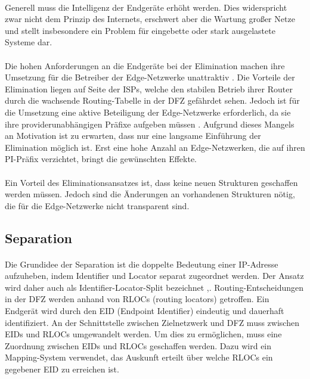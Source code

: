 \paragraph{}
Generell muss die Intelligenz der Endgeräte erhöht werden. Dies widerspricht zwar nicht dem Prinzip des Internets, erschwert aber die Wartung großer Netze und stellt insbesondere ein Problem für eingebette oder stark ausgelastete Systeme dar. 

\paragraph{}
Die hohen Anforderungen an die Endgeräte bei der Elimination machen ihre Umsetzung für die Betreiber der Edge-Netzwerke unattraktiv \cite{jen:2008:start}. Die Vorteile der Elimination liegen auf Seite der ISPs, welche den stabilen Betrieb ihrer Router durch die wachsende Routing-Tabelle in der DFZ gefährdet sehen. Jedoch ist für die Umsetzung eine aktive Beteiligung der Edge-Netzwerke erforderlich, da sie ihre providerunabhängigen Präfixe aufgeben müssen \cite{jen:2008:start}. Aufgrund dieses Mangels an Motivation ist zu erwarten, dass nur eine langsame Einführung der Elimination möglich ist. Erst eine hohe Anzahl an Edge-Netzwerken, die auf ihren PI-Präfix verzichtet, bringt die gewünschten Effekte. 

\paragraph{}
Ein Vorteil des Eliminationsansatzes ist, dass keine neuen Strukturen geschaffen werden müssen. Jedoch sind die Änderungen an vorhandenen Strukturen nötig, die für die Edge-Netzwerke nicht transparent sind.

\subsection{Separation}
\paragraph{}
Die Grundidee der Separation ist die doppelte Bedeutung einer IP-Adresse aufzuheben, indem Identifier und Locator separat zugeordnet werden. Der Ansatz wird daher auch als Identifier-Locator-Split bezeichnet \cite{deering:1996:map},\cite{jen:2008:start}. Routing-Entscheidungen in der DFZ werden anhand von RLOCs (routing locators) getroffen. Ein Endgerät wird durch den EID (Endpoint Identifier) eindeutig und dauerhaft identifiziert. An der Schnittstelle zwischen Zielnetzwerk und DFZ muss zwischen EIDs und RLOCs umgewandelt werden. Um dies zu ermöglichen, muss eine Zuordnung zwischen EIDs und RLOCs geschaffen werden. Dazu wird ein Mapping-System verwendet, das Auskunft erteilt über welche RLOCs ein gegebener EID zu erreichen ist.

